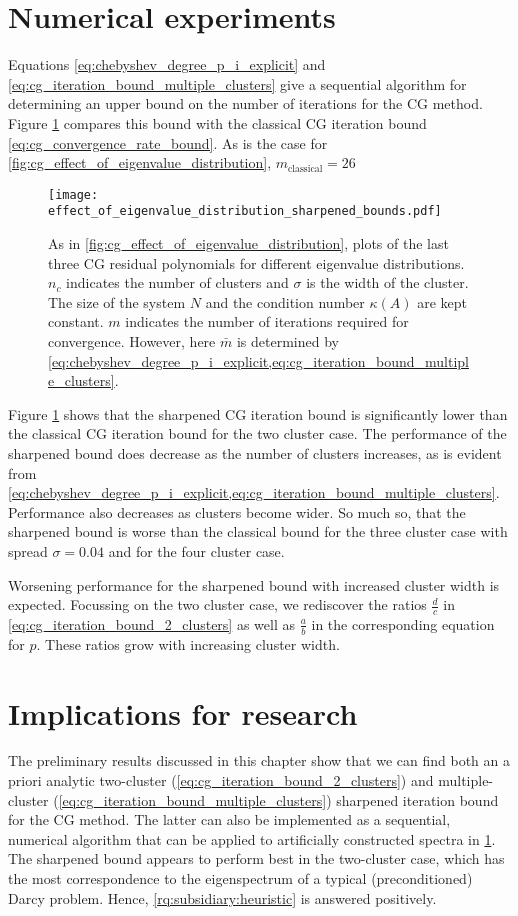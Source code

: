 \section{Numerical experiments}\label{sec:cg_sharpened_convrate_numerical_experiments}
Equations \ref{eq:chebyshev_degree_p_i_explicit} and \ref{eq:cg_iteration_bound_multiple_clusters} give a sequential algorithm for determining an upper bound on the number of iterations for the CG method. Figure \ref{fig:cg_sharpened_bound} compares this bound with the classical CG iteration bound \cref{eq:cg_convergence_rate_bound}. As is the case for \cref{fig:cg_effect_of_eigenvalue_distribution}, $m_{\text{classical}} = 26$
\begin{figure}[H] 
    \centering
    \texttt{[image: effect\_of\_eigenvalue\_distribution\_sharpened\_bounds.pdf]}
    \caption{As in \cref{fig:cg_effect_of_eigenvalue_distribution}, plots of the last three CG residual polynomials for different eigenvalue distributions. $n_c$ indicates the number of clusters and $\sigma$ is the width of the cluster. The size of the system $N$ and the condition number $\kappa(A)$ are kept constant. $m$ indicates the number of iterations required for convergence. However, here $\bar{m}$ is determined by \cref{eq:chebyshev_degree_p_i_explicit,eq:cg_iteration_bound_multiple_clusters}.}
    \label{fig:cg_sharpened_bound}
\end{figure}
Figure \ref{fig:cg_sharpened_bound} shows that the sharpened CG iteration bound is significantly lower than the classical CG iteration bound for the two cluster case. The performance of the sharpened bound does decrease as the number of clusters increases, as is evident from \cref{eq:chebyshev_degree_p_i_explicit,eq:cg_iteration_bound_multiple_clusters}. Performance also decreases as clusters become wider. So much so, that the sharpened bound is worse than the classical bound for the three cluster case with spread $\sigma = 0.04$ and for the four cluster case.

Worsening performance for the sharpened bound with increased cluster width is expected. Focussing on the two cluster case, we rediscover the ratios $\frac{d}{c}$ in \cref{eq:cg_iteration_bound_2_clusters} as well as $\frac{a}{b}$ in the corresponding equation for $p$. These ratios grow with increasing cluster width.

\section{Implications for research}\label{sec:cg_sharpened_convrate_implications}
The preliminary results discussed in this chapter show that we can find both an a priori analytic two-cluster (\cref{eq:cg_iteration_bound_2_clusters}) and multiple-cluster (\cref{eq:cg_iteration_bound_multiple_clusters}) sharpened iteration bound for the CG method. The latter can also be implemented as a sequential, numerical algorithm that can be applied to artificially constructed spectra in \cref{fig:cg_sharpened_bound}. The sharpened bound appears to perform best in the two-cluster case, which has the most correspondence to the eigenspectrum of a typical (preconditioned) Darcy problem. Hence, \ref{rq:subsidiary:heuristic} is answered positively. 


